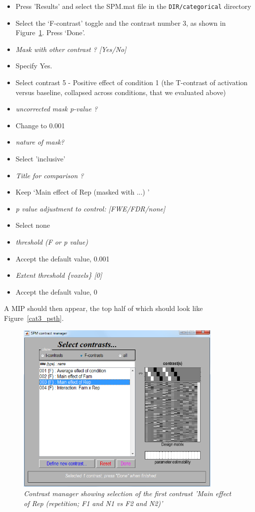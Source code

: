 \documentclass[a4paper,titlepage]{book}
\newcommand{\bi}{\begin{itemize}}
\newcommand{\ei}{\end{itemize}}
\begin{document}
\bi
\item{Press 'Results' and select the SPM.mat file in the 
\verb!DIR/categorical! directory}
\item{Select the `F-contrast' toggle and the contrast number 3, as shown in Figure~\ref{cat3_contrast}. Press `Done'.}
\item{\em Mask with other contrast ? [Yes/No]}
\item{Specify Yes.}
\item{Select contrast 5 - Positive effect of condition 1 (the T-contrast of activation versus baseline, collapsed across conditions, that we evaluated above)}
\item{\em uncorrected mask p-value ?}
\item{Change to 0.001}
\item{\em nature of mask? }
\item{Select 'inclusive'}
\item{\em Title for comparison ?}
\item{Keep `Main effect of Rep (masked with ...) '}
\item{\em p value adjustment to control: [FWE/FDR/none]}
\item{Select none}
\item{\em threshold (F or p value)}
\item{Accept the default value, 0.001}
\item{\em Extent threshold \{voxels\} [0]}
\item{Accept the default value, 0}
\ei
A MIP should then appear, the top half of which should look like Figure~\ref{cat3_psth}.
\begin{figure}
\begin{center}
\includegraphics[width=100mm]{faces/cat3_contrast}
\caption{\em Contrast manager showing selection of the first contrast 'Main effect of Rep (repetition; F1 and N1 vs F2 and N2)'\label{cat3_contrast} }
\end{center}
\end{figure}
\end{document}
